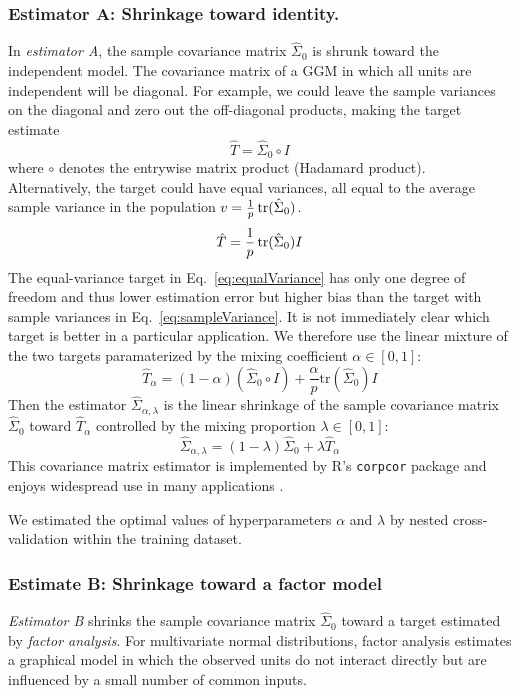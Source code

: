 \subsubsection*{Estimator A: Shrinkage toward identity.}
In \emph{estimator A}, the sample covariance matrix $\hat\Sigma_0$ is shrunk toward the independent model.  The covariance matrix of a GGM in which all units are independent will be diagonal.  
For example, we  could leave the sample variances on the diagonal and zero out the off-diagonal products, making the target estimate 
\begin{equation}\label{eq:sampleVariance}
\hat T= \hat\Sigma_0\circ I
\end{equation}
where $\circ$ denotes the entrywise matrix product (Hadamard product). 
Alternatively, the target could have equal variances, all equal to the average sample variance in the population $v = \frac 1 p \operatorname{tr}(\hat\Sigma_0)$.
\begin{equation}\label{eq:equalVariance}
\hat T=\frac 1 p \operatorname{tr}(\hat\Sigma_0) I
\end{equation}
The equal-variance target in Eq.~\ref{eq:equalVariance} has only one degree of freedom and thus lower estimation error but higher bias than the target with sample variances in Eq.~\ref{eq:sampleVariance}. It is not immediately clear which target is better in a particular application. We therefore use the linear mixture of the two targets paramaterized by the mixing coefficient $\alpha\in[0,1]$:
\begin{equation}
\hat T_\alpha = (1-\alpha)(\hat\Sigma_0 \circ I) + \frac \alpha p \mbox{tr}(\hat \Sigma_0)I
\end{equation}
Then the estimator $\hat\Sigma_{\alpha,\lambda}$ is the linear shrinkage of the sample covariance matrix $\hat\Sigma_0$ toward $\hat T_\alpha$ controlled by the mixing proportion $\lambda\in[0,1]$:
\begin{equation}
\hat\Sigma_{\alpha,\lambda} = (1-\lambda)\hat\Sigma_0 + \lambda\hat T_\alpha 
\end{equation}
This covariance matrix estimator is implemented by R's {\tt corpcor} package \cite{Schaefer:2010} and enjoys widespread use in many applications \cite{Schafer:2005}.

We estimated the optimal values of hyperparameters $ \alpha$ and $ \lambda$  by nested cross-validation within the training dataset. 

\subsubsection*{Estimate B: Shrinkage toward a factor model}
\emph{Estimator B} shrinks the sample covariance matrix $\hat\Sigma_0$ toward a target estimated by \emph{factor analysis}. For multivariate normal distributions, factor analysis estimates a graphical model in which the observed units do not interact directly but are influenced by a small number of common inputs.

